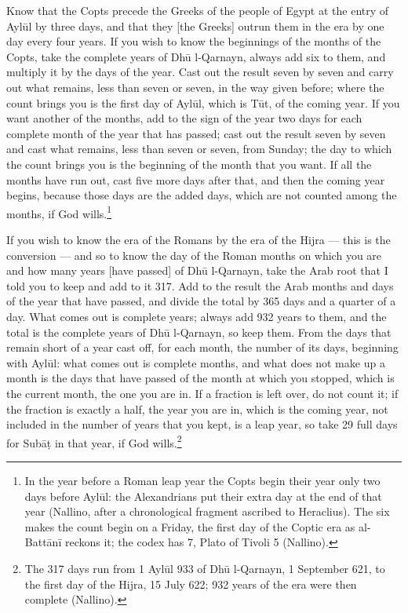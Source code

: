 \documentclass[11pt]{article}
\newcommand{\ArPage}[1]{\marginpar{\footnotesize\color{gray}Ar.\,p.\,#1}}
\begin{document}
\par Know that the Copts precede the Greeks of the people of Egypt at the entry of Aylūl by three days, and that they [the Greeks] outrun them in the era by one day every four years. If you wish to know the beginnings of the months of the Copts, take the complete years of Dhū l-Qarnayn, always add six to them, and multiply it by the days of the year. Cast out the result seven by seven and carry out what remains, less than seven or seven, in the way given before; where the count brings you is the first day of Aylūl, which is Tūt, of the coming year. If you want another of the months, add to the sign of the year two days for each complete month of the year that has passed; cast out the result seven by seven and cast what remains, less than seven or seven, from Sunday; the day to which the count brings you is the beginning of the month that you want. If all the months have run out, cast five more days after that, and then the coming year begins, because those days are the added days, which are not counted among the months, if God wills.\footnote{In the year before a Roman leap year the Copts begin their year only two days before Aylūl: the Alexandrians put their extra day at the end of that year (Nallino, after a chronological fragment ascribed to Heraclius). The six makes the count begin on a Friday, the first day of the Coptic era as al-Battānī reckons it; the codex has 7, Plato of Tivoli 5 (Nallino).}\par
\par \ArPage{103}If you wish to know the era of the Romans by the era of the Hijra — this is the conversion — and so to know the day of the Roman months on which you are and how many years [have passed] of Dhū l-Qarnayn, take the Arab root that I told you to keep and add to it 317. Add to the result the Arab months and days of the year that have passed, and divide the total by 365 days and a quarter of a day. What comes out is complete years; always add 932 years to them, and the total is the complete years of Dhū l-Qarnayn, so keep them. From the days that remain short of a year cast off, for each month, the number of its days, beginning with Aylūl: what comes out is complete months, and what does not make up a month is the days that have passed of the month at which you stopped, which is the current month, the one you are in. If a fraction is left over, do not count it; if the fraction is exactly a half, the year you are in, which is the coming year, not included in the number of years that you kept, is a leap year, so take 29 full days for Subāṭ in that year, if God wills.\footnote{The 317 days run from 1 Aylūl 933 of Dhū l-Qarnayn, 1 September 621, to the first day of the Hijra, 15 July 622; 932 years of the era were then complete (Nallino).}\par
\end{document}
